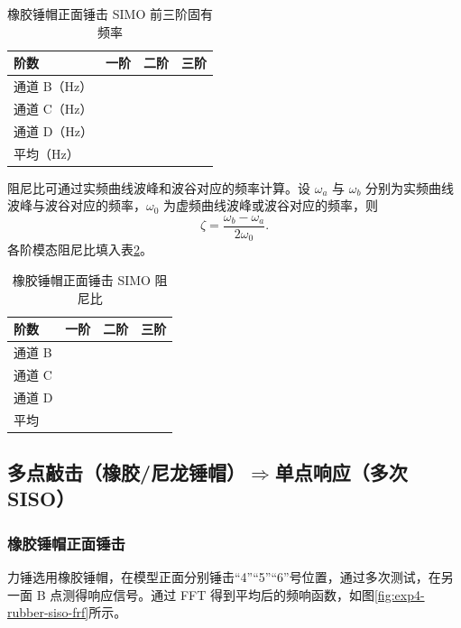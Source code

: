 \documentclass[UTF8,a4paper,12pt]{ctexart}
\newcommand{\blank}[1][2.5cm]{\mbox{\underline{\hspace{#1}}}}
\numberwithin{equation}{section}
\begin{document}
\begin{table}[H]
\centering
\caption{橡胶锤帽正面锤击 SIMO 前三阶固有频率}
\label{tab:exp4-rubber-simo-frequency}
\begin{tabular}{lccc}
\toprule
阶数 & 一阶 & 二阶 & 三阶\\
\midrule
通道 B（Hz） & \blank[1.8cm] & \blank[1.8cm] & \blank[1.8cm]\\
通道 C（Hz） & \blank[1.8cm] & \blank[1.8cm] & \blank[1.8cm]\\
通道 D（Hz） & \blank[1.8cm] & \blank[1.8cm] & \blank[1.8cm]\\
平均（Hz） & \blank[1.8cm] & \blank[1.8cm] & \blank[1.8cm]\\
\bottomrule
\end{tabular}
\end{table}

阻尼比可通过实频曲线波峰和波谷对应的频率计算。设 $\omega_a$ 与 $\omega_b$ 分别为实频曲线波峰与波谷对应的频率，$\omega_0$ 为虚频曲线波峰或波谷对应的频率，则
\begin{equation}
  \zeta=\frac{\omega_b-\omega_a}{2\omega_0}.
  \label{eq:exp4-damping}
\end{equation}
各阶模态阻尼比填入表\ref{tab:exp4-rubber-simo-damping}。

\begin{table}[H]
\centering
\caption{橡胶锤帽正面锤击 SIMO 阻尼比}
\label{tab:exp4-rubber-simo-damping}
\begin{tabular}{lccc}
\toprule
阶数 & 一阶 & 二阶 & 三阶\\
\midrule
通道 B & \blank[1.8cm] & \blank[1.8cm] & \blank[1.8cm]\\
通道 C & \blank[1.8cm] & \blank[1.8cm] & \blank[1.8cm]\\
通道 D & \blank[1.8cm] & \blank[1.8cm] & \blank[1.8cm]\\
平均 & \blank[1.8cm] & \blank[1.8cm] & \blank[1.8cm]\\
\bottomrule
\end{tabular}
\end{table}

\subsection{多点敲击（橡胶/尼龙锤帽）\texorpdfstring{$\Rightarrow$}{⇒}单点响应（多次 SISO）}
\subsubsection{橡胶锤帽正面锤击}
力锤选用橡胶锤帽，在模型正面分别锤击“4”“5”“6”号位置，通过多次测试，在另一面 B 点测得响应信号。通过 FFT 得到平均后的频响函数，如图\ref{fig:exp4-rubber-siso-frf}所示。
\end{document}
